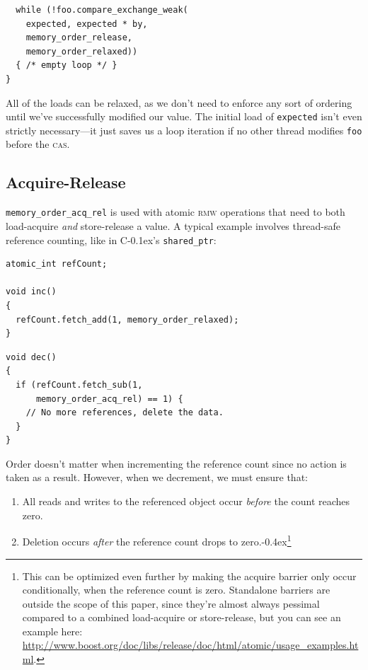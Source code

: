 \documentclass[fontsize=10pt, numbers=endperiod]{scrartcl}
\newcommand{\codesize}{\fontsize{10pt}{12pt}}
\newcommand{\punckern}{\kern-0.4ex}
\newcommand{\cpp}[1]{C\kern-0.1ex\raisebox{0.15ex}{\texttt{++}}{\addfontfeature{Numbers=LowercaseOff}#1}}
\newenvironment{colfigure}
  {\par\vspace{1\baselineskip minus 0.5\baselineskip}\noindent\minipage{\linewidth}}
  {\endminipage\vspace*{1\baselineskip minus 0.7\baselineskip}}
\begin{document}
\begin{multicols}{2}
\begin{colfigure}
\begin{verbatim}
  while (!foo.compare_exchange_weak(
    expected, expected * by,
    memory_order_release,
    memory_order_relaxed))
  { /* empty loop */ }
}
\end{verbatim}
\end{colfigure}
All of the loads can be relaxed, as we don't need to enforce any sort of ordering
until we've successfully modified our value.
The initial load of \texttt{expected} isn't even strictly necessary---it just
saves us a loop iteration if no other thread modifies \texttt{foo} before the
\textsc{cas}.

\subsection{Acquire-Release}

\texttt{memory\_order\_acq\_rel} is used with atomic \textsc{rmw} operations
that need to both load-acquire \emph{and} store-release a value.
A typical example involves thread-safe reference counting,
like in \cpp{}'s \texttt{shared_ptr}:
\begin{colfigure}
\begin{verbatim}
atomic_int refCount;

void inc()
{
  refCount.fetch_add(1, memory_order_relaxed);
}
\end{verbatim}
\end{colfigure}
\begin{colfigure}
\begin{verbatim}
void dec()
{
  if (refCount.fetch_sub(1,
      memory_order_acq_rel) == 1) {
    // No more references, delete the data.
  }
}
\end{verbatim}
\end{colfigure}

Order doesn't matter when incrementing the reference
count since no action is taken as a result.
However, when we decrement, we must ensure that:
\begin{enumerate}
\item All reads and writes to the referenced object occur
\emph{before} the count reaches zero.
\item Deletion occurs \emph{after} the reference count drops to
    zero.\punckern\footnote{This can be optimized even further by
    making the acquire barrier only occur conditionally, when the reference
    count is zero.
    Standalone barriers are outside the scope of this paper,
    since they're almost always pessimal compared to a combined load-acquire
    or store-release, but you can see an example here:
    \url{http://www.boost.org/doc/libs/release/doc/html/atomic/usage\_examples.html}.}
\end{enumerate}


\end{multicols}
\end{document}
